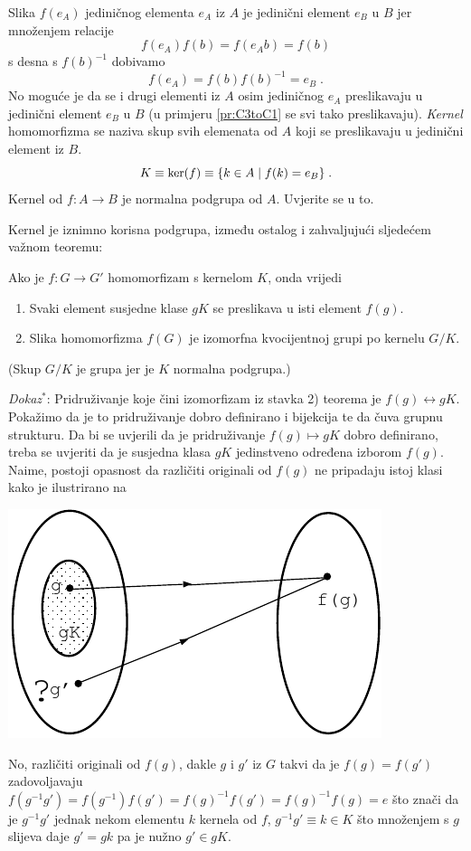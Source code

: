 Slika $f(e_A)$ jediničnog elementa $e_A$ iz $A$ je jedinični element $e_B$ u $B$ jer
množenjem relacije
$$ f(e_A) f(b) = f(e_A b) = f(b) $$
s desna s $f(b)^{-1}$ dobivamo
$$ f(e_A) = f(b) f(b)^{-1} = e_B \;. $$
No moguće je da se i drugi elementi iz $A$ osim jediničnog $e_A$ preslikavaju u 
jedinični element $e_B$ u $B$ (u primjeru \ref{pr:C3toC1} se svi tako preslikavaju).
\emph{Kernel} homomorfizma se naziva skup svih elemenata od $A$ koji se
preslikavaju u jedinični element iz $B$.
$$ K \equiv {\rm ker}(f) \equiv \{ k\in A \; | \; f(k) = e_B \} \;. $$
Kernel od $f:A\to B$ je normalna podgrupa od $A$. Uvjerite se u to.

Kernel je iznimno korisna podgrupa, između ostalog i zahvaljujući sljedećem
važnom teoremu:
\begin{teorem}
\label{th:izomorfizam}
Ako je $f:G\to G'$ homomorfizam s kernelom $K$, onda vrijedi
\begin{enumerate}
\item Svaki element susjedne klase $gK$ se preslikava u isti element $f(g)$.
\item Slika homomorfizma $f(G)$ je izomorfna kvocijentnoj grupi po kernelu $G/K$.
\end{enumerate}
\end{teorem}
(Skup $G/K$ je grupa jer je $K$ normalna podgrupa.)

\emph{Dokaz}$^{*}$: Pridruživanje koje
čini izomorfizam iz stavka 2) teorema je $f(g)\leftrightarrow gK$.
Pokažimo da je to pridruživanje dobro definirano i bijekcija te da čuva grupnu
strukturu.
Da bi se uvjerili da je pridruživanje $f(g)\mapsto gK$ dobro definirano, treba
se uvjeriti da je susjedna klasa $gK$ jedinstveno određena izborom $f(g)$. Naime,
postoji opasnost da različiti originali od $f(g)$ ne pripadaju istoj klasi
kako je ilustrirano na\\[2ex]
\vspace*{3ex}
\centerline{\includegraphics[scale=0.8]{pics/homo1}}
No, različiti originali od $f(g)$, dakle $g$ i $g'$ iz $G$
takvi da je  $f(g)=f(g')$ zadovoljavaju
$f(g^{-1} g')=f(g^{-1})f(g')=f(g)^{-1}f(g')=f(g)^{-1}f(g)=e$ što  znači
da je $g^{-1} g'$ jednak nekom elementu $k$ kernela od $f$,
$g^{-1} g' \equiv k\in K$ što množenjem s $g$ slijeva
daje $g'=gk$ pa je nužno $g' \in gK$.


